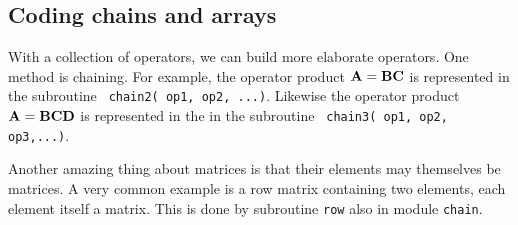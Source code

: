 %
%
%


\subsection{Coding chains and arrays}

With a collection of operators,
we can build more elaborate operators.
One method is chaining.
For example, the operator product
$\bold A = \bold B \bold C$
is represented in the subroutine 
\texttt{ chain2( op1, op2, ...)}.
Likewise the operator product
$\bold A = \bold B \bold C \bold D$
is represented in the in the subroutine 
\texttt{ chain3( op1, op2, op3,...)}.
\par
Another amazing thing about matrices is that their elements
may themselves be matrices.
A very common example
is a row matrix containing two elements,
each element itself a matrix.
This is done by subroutine \texttt{row}
also in module \texttt{chain}.



